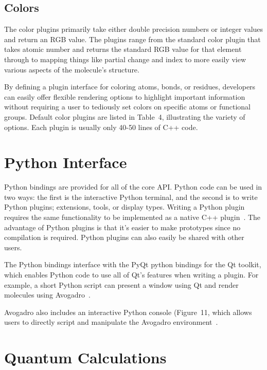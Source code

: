 \documentclass[10pt]{bmc_article}
\newenvironment{bmcformat}{\begin{raggedright}
  \baselineskip20pt\sloppy\setboolean{publ}{false}}{\end{raggedright}
  \baselineskip20pt\sloppy}
\begin{document}
\begin{bmcformat}
\subsection*{Colors}

The color plugins primarily take either double precision numbers or integer
values and return an RGB value. The plugins range from the standard color
plugin that takes atomic number and returns the standard RGB value for that
element through to mapping things like partial change and index to more easily
view various aspects of the molecule's structure.

By defining a plugin interface for coloring atoms, bonds, or residues,
developers can easily offer flexible rendering options to highlight
important information without requiring a user to tediously set colors
on specific atoms or functional groups. Default color plugins are
listed in Table~4, illustrating the variety of
options. Each plugin is usually only 40-50 lines of C++ code.

\section*{Python Interface}

Python bindings are provided for all of the core API. Python code can be used
in two ways: the first is the interactive Python terminal, and the second is to
write Python plugins; extensions, tools, or display types.
Writing a Python plugin requires the same functionality to be implemented as a
native C++ plugin~\cite{PythonExtensions}. The advantage of Python
plugins is that it's easier to make prototypes since no compilation is
required. Python plugins can also easily be shared with other users.

The Python bindings interface with the PyQt python bindings for the Qt
toolkit, which enables Python code to use all of Qt's features when writing a
plugin. For example, a short Python script can present a window using Qt and
render molecules using Avogadro~\cite{PythonWindowExample}.

Avogadro also includes an interactive Python console
(Figure~11, which allows users to directly script
and manipulate the Avogadro environment~\cite{PythonTerminalTutorial}.


\section*{Quantum Calculations} %


\end{bmcformat}
\end{document}
